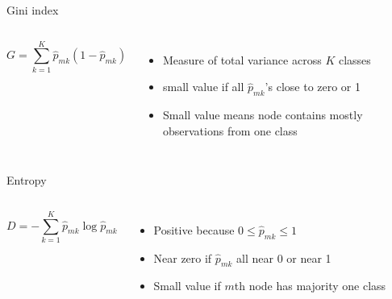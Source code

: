 \documentclass[aspectratio=169,usenames,dvipsnames]{beamer}
\newcommand{\InstructorList}[1]{
\begin{itemize}
	\color{orange}
	#1
\end{itemize}
}
\begin{document}
\begin{frame}[t]{Gini index}

\begin{columns}
\centering
\begin{equation*}
	G = \sum_{k=1}^K \hat p_{mk} (1-\hat p_{mk})
\end{equation*}
\centering
\InstructorList{
  \item Measure of total variance across $K$ classes
	\item small value if all $\hat p _{mk}$'s close to zero or 1
	\item Small value means node contains mostly observations from one class
}

\end{columns}

\end{frame}
\begin{frame}[t]{Entropy }

\begin{columns}
\centering
\begin{equation*}
	D = - \sum_{k=1}^K \hat p_{mk} \log \hat p _{mk}
\end{equation*}
\centering
\InstructorList{
  \item Positive because $0 \leq \hat p_{mk} \leq 1$
	\item Near zero if $\hat p_{mk}$ all near 0 or near 1
	\item Small value if $m$th node has majority one class
}

\end{columns}

\end{frame}
\end{document}
